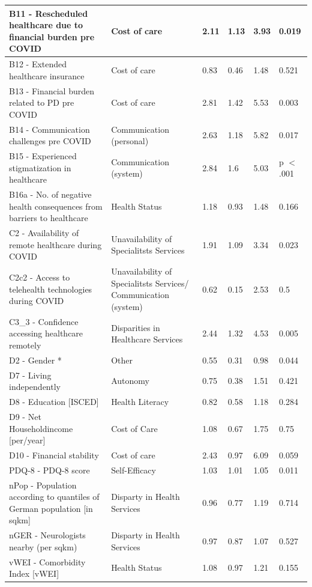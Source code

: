 \documentclass[a4paper,oneside,11pt,english]{scrartcl}
\begin{document}
\begin{longtable}[ht!]{|p{5.5cm} | p{3.5cm} | p{1cm} | l | l | p{1.5cm} |}
	B11 - Rescheduled healthcare due to financial burden pre \textsc{COVID} & Cost of care & 2.11 & 1.13 & 3.93 & 0.019 \\ \hline
	B12 - Extended healthcare insurance & Cost of care & 0.83 & 0.46 & 1.48 & 0.521 \\ \hline
	B13 - Financial burden related to \textsc{PD} pre \textsc{COVID} & Cost of care & 2.81 & 1.42 & 5.53 & 0.003 \\ \hline
	B14 - Communication challenges pre \textsc{COVID} & Communication (personal) & 2.63 & 1.18 & 5.82 & 0.017 \\ \hline
	B15 - Experienced stigmatization in healthcare & Communication (system) & 2.84 & 1.6 & 5.03 & p $<$ .001 \\ \hline
	B16a - No. of negative health consequences from barriers to healthcare & Health Status & 1.18 & 0.93 & 1.48 & 0.166 \\ \hline
	C2 - Availability of remote healthcare during \textsc{COVID} & Unavailability of Specialitsts Services & 1.91 & 1.09 & 3.34 & 0.023 \\ \hline
	C2c2 - Access to telehealth technologies during \textsc{COVID} & Unavailability of Specialitsts Services/ Communication (system) & 0.62 & 0.15 & 2.53 & 0.5 \\ \hline
	C3\_3 - Confidence accessing healthcare remotely & Disparities in Healthcare Services & 2.44 & 1.32 & 4.53 & 0.005 \\ \hline
	D2 - Gender * & Other & 0.55 & 0.31 & 0.98 & 0.044 \\ \hline
	D7 - Living independently & Autonomy & 0.75 & 0.38 & 1.51 & 0.421 \\ \hline
	D8 - Education [ISCED] & Health Literacy & 0.82 & 0.58 & 1.18 & 0.284 \\ \hline
	D9 - Net Householdincome [per/year] & Cost of Care & 1.08 & 0.67 & 1.75 & 0.75 \\ \hline
	D10 - Financial stability & Cost of care & 2.43 & 0.97 & 6.09 & 0.059 \\ \hline
	\textsc{PD}Q-8 - \textsc{PD}Q-8 score & Self-Efficacy & 1.03 & 1.01 & 1.05 & 0.011 \\ \hline
	nPop - Population according to quantiles of German population [in sqkm] & Disparty in Health Services & 0.96 & 0.77 & 1.19 & 0.714 \\ \hline
	nGER - Neurologists nearby (per sqkm) & Disparty in Health Services & 0.97 & 0.87 & 1.07 & 0.527 \\ \hline
	vWEI - Comorbidity Index [vWEI] & Health Status & 1.08 & 0.97 & 1.21 & 0.155 \\ \hline
\end{longtable}
\end{document}
